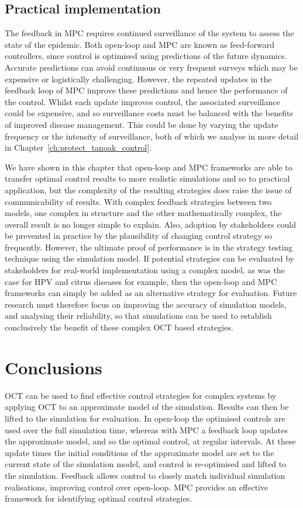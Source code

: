 \subsection{Practical implementation}

The feedback in MPC requires continued surveillance of the system to assess the state of the epidemic. Both open-loop and MPC are known as feed-forward controllers, since control is optimised using predictions of the future dynamics. Accurate predictions can avoid continuous or very frequent surveys which may be expensive or logistically challenging. However, the repeated updates in the feedback loop of MPC improve these predictions and hence the performance of the control. Whilst each update improves control, the associated surveillance could be expensive, and so surveillance costs must be balanced with the benefits of improved disease management. This could be done by varying the update frequency or the intensity of surveillance, both of which we analyse in more detail in Chapter~\ref{ch:protect_tanoak_control}.

We have shown in this chapter that open-loop and MPC frameworks are able to transfer optimal control results to more realistic simulations and so to practical application, but the complexity of the resulting strategies does raise the issue of communicability of results. With complex feedback strategies between two models, one complex in structure and the other mathematically complex, the overall result is no longer simple to explain. Also, adoption by stakeholders could be prevented in practice by the plausibility of changing control strategy so frequently. However, the ultimate proof of performance is in the strategy testing technique using the simulation model. If potential strategies can be evaluated by stakeholders for real-world implementation using a complex model, as was the case for HPV \citep{choi_transmission_2010} and citrus diseases \citep{cunniffe_optimising_2015} for example, then the open-loop and MPC frameworks can simply be added as an alternative strategy for evaluation. Future research must therefore focus on improving the accuracy of simulation models, and analysing their reliability, so that simulations can be used to establish conclusively the benefit of these complex OCT based strategies.

\section{Conclusions}

OCT can be used to find effective control strategies for complex systems by applying OCT to an approximate model of the simulation. Results can then be lifted to the simulation for evaluation. In open-loop the optimised controls are used over the full simulation time, whereas with MPC a feedback loop updates the approximate model, and so the optimal control, at regular intervals. At these update times the initial conditions of the approximate model are set to the current state of the simulation model, and control is re-optimised and lifted to the simulation. Feedback allows control to closely match individual simulation realisations, improving control over open-loop. MPC provides an effective framework for identifying optimal control strategies.
